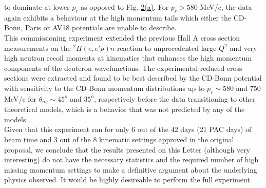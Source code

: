 \twocolumngrid
\noindent to dominate at lower $p_{r}$ as opposed to Fig. \hyperref[fig:fig2]{2(a)}.
For $p_{r}>580$ MeV/c, the data again exhibits a behaviour at the high momentum tails which either the CD-Bonn, Paris or AV18 potentials are unable to describe.\\
\indent This commissioning experiment extended the previous Hall A cross section measurements on the $^{2}H(e,e'p)n$ reaction to 
unprecedented large $Q^{2}$ and very high neutron recoil momenta at kinematics that enhances the high momentum components of the deuteron wavefunctions.
The experimental reduced cross sections were extracted and found to be best described by the CD-Bonn potential with sensitivity to the CD-Bonn momentum distributions
up to $p_{r}\sim580$ and $750$ MeV/c for $\theta_{nq}\sim45^{o}$ and $35^{o}$, respectively before the data transitioning to other theoretical models, which is a
behavior that was not predicted by any of the models. \\
\indent Given that this experiment ran for only 6 out of the 42 days (21 PAC days) of beam time and 3 out of the 8 kinematic settings approved in
the original proposal\cite{e12_10_003_proposal}, we conclude that the results presented on this Letter (although very interesting) do not have the
necessary statistics and the required number of high missing momentum settings to make a definitive argument about the underlying physics observed.
It would be highly desireable to perform the full experiment 





